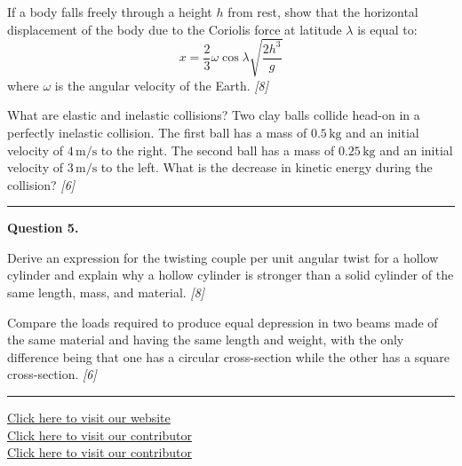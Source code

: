 \documentclass[11pt,a4paper]{article}
\newcommand{\pts}[1]{\hfill   \textit{[#1]}}
\begin{document}
\begin{parts}
  \item If a body falls freely through a height $h$ from rest, show that the horizontal displacement of the body due to the Coriolis force at latitude $\lambda$ is equal to:
    \[ x = \frac{2}{3} \omega \cos\lambda \sqrt{\frac{2h^3}{g}} \]
    where $\omega$ is the angular velocity of the Earth. \pts{8}
  \item What are elastic and inelastic collisions? Two clay balls collide head-on in a perfectly inelastic collision. The first ball has a mass of $0.5\, \text{kg}$ and an initial velocity of $4\, \text{m/s}$ to the right. The second ball has a mass of $0.25\, \text{kg}$ and an initial velocity of $3\, \text{m/s}$ to the left. What is the decrease in kinetic energy during the collision? \pts{6}
\end{parts}

\medskip\rule{\linewidth}{0.2pt}




\noindent   \textbf{Question 5.}

\begin{parts}
  \item Derive an expression for the twisting couple per unit angular twist for a hollow cylinder and explain why a hollow cylinder is stronger than a solid cylinder of the same length, mass, and material. \pts{8}
  \item Compare the loads required to produce equal depression in two beams made of the same material and having the same length and weight, with the only difference being that one has a circular cross-section while the other has a square cross-section. \pts{6}
\end{parts}

\vfill
\rule{\linewidth}{0.4pt}

\begin{center}\small
  \href{https://bhu-exam.vercel.app/}{Click here to visit our website}\\[4pt]
  \href{https://me-aryan.vercel.app/}{Click here to visit our contributor}\\[4pt]
  \href{https://quashan-me.vercel.app/}{Click here to visit our contributor}
\end{center}
\end{document}
